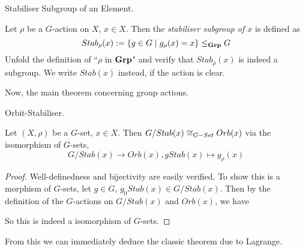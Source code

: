 \documentclass[../book.tex]{subfiles}
\begin{document}
\begin{dfn} Stabiliser Subgroup of an Element. 

    Let $\rho$ be a $G$-action on $X$, $x \in X$. 
    Then the \emph{stabiliser subgroup of $x$} is defined as
    \[
        Stab_\rho(x) := \{g \in G \mid g_\rho(x) = x\} \leq_{\mathbf{Grp}} G
    \]
    Unfold the definition of ``$\rho$ in $\mathbf{Grp}$" and verify that 
    $Stab_\rho(x)$ is indeed a subgroup. 
    We write $Stab(x)$ instead, if the action is clear. 

\end{dfn}
Now, the main theorem concerning group actions. 
\begin{thm} Orbit-Stabiliser. 
    
    Let $(X,\rho)$ be a $G$-set, $x \in X$.
    Then $G / Stab(x) \cong_{G-Set} Orb(x)$ via the isomorphism of $G$-sets, 
    \[
        G / Stab(x) \to Orb(x), gStab(x) \mapsto g_\rho(x)
    \]
\end{thm}
\begin{proof}
    Well-definedness and bijectivity are easily verified. 
    To show this is a morphism of $G$-sets, let $g \in G$, $g_0Stab(x) \in G / Stab(x)$. 
    Then by the definition of the $G$-actions on $G/Stab(x)$ and $Orb(x)$, 
    we have 
    \begin{figure}[ht]
        \centering
    \end{figure}
    
    So this is indeed a isomorphism of $G$-sets. 
\end{proof}

From this we can immediately deduce the classic theorem due to Lagrange. 
\end{document}
